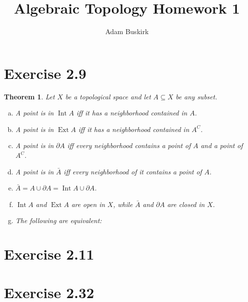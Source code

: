 \documentclass{article}
\title{Algebraic Topology Homework 1}
\author{Adam Buskirk}
\newtheorem{theorem}[subsection]{Theorem}
\theoremstyle{definition}
\begin{document}
\maketitle
\section{Exercise 2.9}
\begin{theorem}
Let $X$ be a topological space and let $A \subseteq X$ be any subset.
\begin{enumerate}[(a)]
\item A point is in $\operatorname{Int} A$ iff it has a neighborhood contained in $A$.
\item A point is in $\operatorname{Ext} A$ iff it has a neighborhood contained in $A^C$.
\item A point is in $\partial A$ iff every neighborhood contains a point of $A$ and a point of $A^C$.
\item A point is in $\bar{A}$ iff every neighborhood of it contains a point of $A$. 
\item $\bar{A} = A \cup \partial A = \operatorname{Int} A \cup \partial A$.
\item $\operatorname{Int} A$ and $\operatorname{Ext} A$ are open in $X$, while $\bar{A}$
    and $\partial A$ are closed in $X$.
\item The following are equivalent:
    \begin{enumerate}
    \end{enumerate}
\end{enumerate}
\end{theorem}
\section{Exercise 2.11}
\section{Exercise 2.32}
\end{document}
